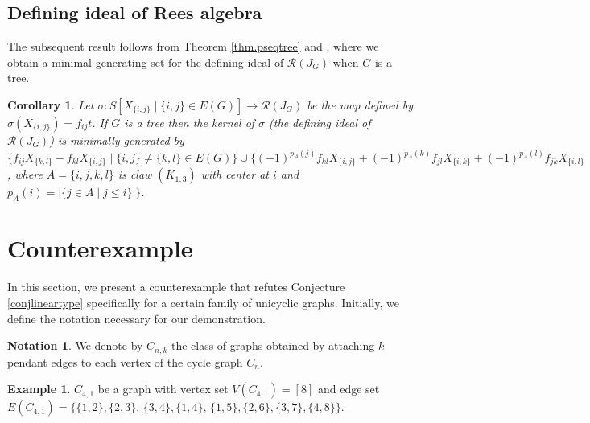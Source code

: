 \documentclass[11pt,a4paper,reqno]{amsart}
\newtheorem{corollary}[theorem]{Corollary}
\theoremstyle{definition}
\newtheorem{example}[theorem]{Example}
\newtheorem{notation}[theorem]{Notation}
\begin{document}
    
\subsection{Defining ideal of Rees algebra}
The subsequent result follows from Theorem \ref{thm.pseqtree} and \cite[Theorem 3.2]{JAR2021}, where we obtain a minimal generating set for the defining ideal of $\mathcal{R}(J_G)$ when $G$ is a tree. 


\begin{corollary}
    Let $\sigma : S[X_{\{i,j\}} \mid \{i,j\} \in E(G)] \rightarrow \mathcal{R}(J_G)$ be the map defined by $\sigma(X_{\{i,j\}})= f_{ij}t$. If $G$ is a tree then the kernel of $\sigma$ (the defining ideal of $\mathcal{R}(J_G)$) is minimally generated by 
    $\{ f_{ij}X_{\{k,l\}}-f_{kl}X_{\{i,j\}} \mid \{i,j\} \neq \{k,l\} \in E(G)\} \cup \{(-1)^{p_A(j)}f_{kl}X_{\{i,j\}}+(-1)^{p_A(k)}f_{jl}X_{\{i,k\}}+(-1)^{p_A(l)}f_{jk}X_{\{i,l\}}$, where $A=\{i,j,k,l\}$ is claw $(K_{1,3})$ with center at $i$ and $p_A(i)= \lvert \{j \in A \mid j \leq i\} \rvert\}$.
\end{corollary}



\section{Counterexample} \label{sec.counterex}
In this section, we present a counterexample that refutes Conjecture \ref{conjlineartype} specifically for a certain family of unicyclic graphs. Initially, we define the notation necessary for our demonstration.


\begin{notation}
    We denote by $C_{n,k}$ the class of graphs obtained by attaching $k$ pendant edges to each vertex of the cycle graph $C_n$.
\end{notation}


\begin{example} \label{exa.c41}
    $C_{4,1}$ be a graph with vertex set $V(C_{4,1})=[8]$ and edge set $E(C_{4,1})=\{\{1,2\},\{2,3\}$, $\{3,4\},\{1,4\}$, $\{1,5\},\{2,6\},\{3,7\},\{4,8\}\}$.
\end{example}
\end{document}
